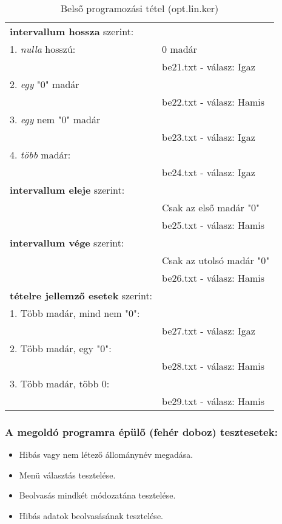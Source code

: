 \documentclass[a4paper]{article}
\begin{document}
      \begin{table}[H]
        \caption*{Belső programozási tétel (opt.lin.ker)}
        \begin{tabular*}{\textwidth}{ll}
          \toprule
          \textbf{intervallum hossza} szerint: & \\
          1. \textit{nulla} hosszú: & 0 madár \\
          & \quad be21.txt - válasz: Igaz \\
          2. \textit{egy} "0" madár & \\
          & \quad be22.txt - válasz: Hamis \\
          3. \textit{egy} nem "0" madár &\\
          & \quad be23.txt - válasz: Igaz \\
          4. \textit{több} madár: &  \\
          & \quad be24.txt - válasz: Igaz \\
          \textbf{intervallum eleje} szerint: & \\
          & Csak az első madár "0" \\
          & \quad be25.txt - válasz: Hamis \\
          \textbf{intervallum vége} szerint: & \\
          & Csak az utolsó madár "0" \\
          & \quad be26.txt - válasz: Hamis \\
          \textbf{tételre jellemző esetek} szerint: & \\
          1. Több madár, mind nem "0": & \\
          & \quad be27.txt - válasz: Igaz \\
          2. Több madár, egy "0": & \\
          & \quad be28.txt - válasz: Hamis \\
          3. Több madár, több 0: & \\
          & \quad be29.txt - válasz: Hamis \\
          \bottomrule
        \end{tabular*}
      \end{table}
    \subsubsection{A megoldó programra épülő (fehér doboz) tesztesetek:}
      \begin{itemize}
        \item Hibás vagy nem létező állománynév megadása.
        \item Menü választás tesztelése.
        \item Beolvasás mindkét módozatána tesztelése.
        \item Hibás adatok beolvasásának tesztelése.
      \end{itemize}
\end{document}
